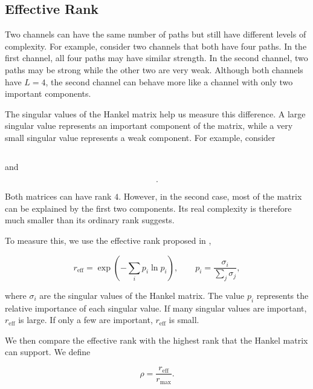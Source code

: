 \documentclass[journal]{IEEEtran}
\begin{document}
\subsection{Effective Rank}
\label{sec:effrank}

Two channels can have the same number of paths but still have different
levels of complexity. For example, consider two channels that both have
four paths. In the first channel, all four paths may have similar strength.
In the second channel, two paths may be strong while the other two are very
weak. Although both channels have $L=4$, the second channel can behave
more like a channel with only two important components.

The singular values of the Hankel matrix help us measure this difference.
A large singular value represents an important component of the matrix,
while a very small singular value represents a weak component. For example,
consider

\begin{equation}
[10,\;9,\;8,\;7]
\end{equation}

and

\begin{equation}
[10,\;8,\;0.2,\;0.1].
\end{equation}

Both matrices can have rank $4$. However, in the second case, most of the
matrix can be explained by the first two components. Its real complexity
is therefore much smaller than its ordinary rank suggests.

To measure this, we use the effective rank proposed in
\cite{royvetterli2007},

\begin{equation}
r_{\mathrm{eff}}
=
\exp
\left(
-\sum_i p_i\ln p_i
\right),
\qquad
p_i
=
\frac{\sigma_i}{\sum_j\sigma_j},
\end{equation}

where $\sigma_i$ are the singular values of the Hankel matrix. The value
$p_i$ represents the relative importance of each singular value. If many
singular values are important, $r_{\mathrm{eff}}$ is large. If only a few
are important, $r_{\mathrm{eff}}$ is small.

We then compare the effective rank with the highest rank that the Hankel
matrix can support. We define

\begin{equation}
\rho
=
\frac{r_{\mathrm{eff}}}{r_{\max}}.
\end{equation}
\end{document}
